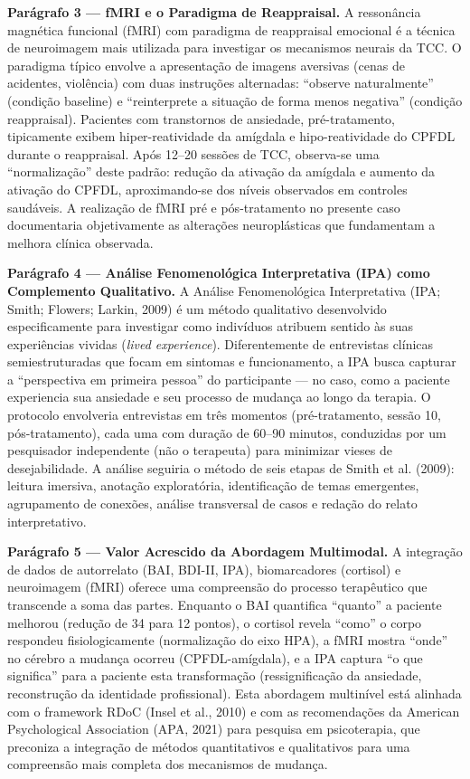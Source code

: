 \documentclass[12pt,a4paper]{article}
\begin{document}
\textbf{Parágrafo 3 — fMRI e o Paradigma de Reappraisal.} A ressonância magnética funcional (fMRI) com paradigma de reappraisal emocional é a técnica de neuroimagem mais utilizada para investigar os mecanismos neurais da TCC. O paradigma típico envolve a apresentação de imagens aversivas (cenas de acidentes, violência) com duas instruções alternadas: ``observe naturalmente'' (condição baseline) e ``reinterprete a situação de forma menos negativa'' (condição reappraisal). Pacientes com transtornos de ansiedade, pré-tratamento, tipicamente exibem hiper-reatividade da amígdala e hipo-reatividade do CPFDL durante o reappraisal. Após 12--20 sessões de TCC, observa-se uma ``normalização'' deste padrão: redução da ativação da amígdala e aumento da ativação do CPFDL, aproximando-se dos níveis observados em controles saudáveis. A realização de fMRI pré e pós-tratamento no presente caso documentaria objetivamente as alterações neuroplásticas que fundamentam a melhora clínica observada.

\textbf{Parágrafo 4 — Análise Fenomenológica Interpretativa (IPA) como Complemento Qualitativo.} A Análise Fenomenológica Interpretativa (IPA; Smith; Flowers; Larkin, 2009) é um método qualitativo desenvolvido especificamente para investigar como indivíduos atribuem sentido às suas experiências vividas (\textit{lived experience}). Diferentemente de entrevistas clínicas semiestruturadas que focam em sintomas e funcionamento, a IPA busca capturar a ``perspectiva em primeira pessoa'' do participante --- no caso, como a paciente experiencia sua ansiedade e seu processo de mudança ao longo da terapia. O protocolo envolveria entrevistas em três momentos (pré-tratamento, sessão 10, pós-tratamento), cada uma com duração de 60--90 minutos, conduzidas por um pesquisador independente (não o terapeuta) para minimizar vieses de desejabilidade. A análise seguiria o método de seis etapas de Smith et al. (2009): leitura imersiva, anotação exploratória, identificação de temas emergentes, agrupamento de conexões, análise transversal de casos e redação do relato interpretativo.

\textbf{Parágrafo 5 — Valor Acrescido da Abordagem Multimodal.} A integração de dados de autorrelato (BAI, BDI-II, IPA), biomarcadores (cortisol) e neuroimagem (fMRI) oferece uma compreensão do processo terapêutico que transcende a soma das partes. Enquanto o BAI quantifica ``quanto'' a paciente melhorou (redução de 34 para 12 pontos), o cortisol revela ``como'' o corpo respondeu fisiologicamente (normalização do eixo HPA), a fMRI mostra ``onde'' no cérebro a mudança ocorreu (CPFDL-amígdala), e a IPA captura ``o que significa'' para a paciente esta transformação (ressignificação da ansiedade, reconstrução da identidade profissional). Esta abordagem multinível está alinhada com o framework RDoC (Insel et al., 2010) e com as recomendações da American Psychological Association (APA, 2021) para pesquisa em psicoterapia, que preconiza a integração de métodos quantitativos e qualitativos para uma compreensão mais completa dos mecanismos de mudança.
\end{document}
